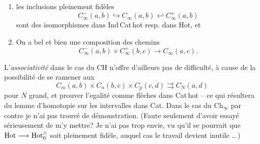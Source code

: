 \begin{enumerate}
\item[a)] les inclusions pleinement fidèles
\[
C^{-}_{\infty}(a,b)\hookrightarrow C_{\infty}(a,b)\hookleftarrow C^{+}_{\infty}(a,b)
\]
sont des isomorphismes dans Ind\,Cat\,hot resp. dans Hot, et
\item[b)] On a bel et bien une composition des chemins
\[
C^{-}_{\infty}(a,b)\times C^{+}_{\infty}(b,c)\longrightarrow C_{\infty}(a,c).
\]
\end{enumerate}

L'\textit{associativité} dans le cas du CH n'offre d'ailleurs pas de difficulté, à cause de la possibilité de se ramener aux
\[
C_m(a,b)\times C_n(b,c)\times C_p(c,d)\rightrightarrows C_N(a,d)
\]
pour $N$ grand, et prouver l'egalité comme flèches dans Cat\,hot -- ce qui résultera du lemme %
d'homotopie sur les intervalles dans Cat. Dans le cas du $\mathrm{Ch}_{\infty}$ par contre je n'ai pas trouvé de démonstration. (Faute seulement d'avoir essayé sérieusement de m'y mettre? Je n'ai pas trop envie, vu qu'il se pourrait que $\mathrm{Hot}\longrightarrow\mathrm{Hot}_0^{\wedge}$ soit pleinement fidèle, auquel cas le travail devient inutile \dots\,)

